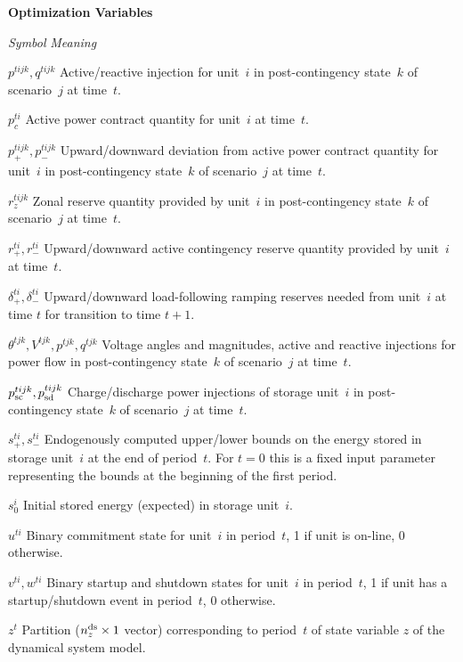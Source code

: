 \documentclass[12pt]{article}
\newcommand{\namelistlabel}[1]{\mbox{#1}\hfil}
\newenvironment{namelist}[1]{%
\begin{list}{}
  {
    \let\makelabel\namelistlabel
    \settowidth{\labelwidth}{#1}
    \setlength{\leftmargin}{1.1\labelwidth}
  }
 }{%
\end{list}}
\numberwithin{equation}{section}
\numberwithin{table}{section}
\numberwithin{figure}{section}
\begin{document}
\begin{namelist}{XXXXXXXXXX}
\item[]
\item[{\bf Optimization Variables}]
\item[\emph{Symbol}] \emph{Meaning}
\item[$p^{tijk}, q^{tijk}$] Active/reactive injection for unit~$i$ in post-contingency state~$k$ of scenario~$j$ at time~$t$.
\item[$p_c^{ti}$] Active power contract quantity for unit~$i$ at time~$t$.
\item[$p_+^{tijk}, p_-^{tijk}$] Upward/downward deviation from active power contract quantity for unit~$i$ in post-contingency state~$k$ of scenario~$j$ at time~$t$.
\item[$r_z^{tijk}$] Zonal reserve quantity provided by unit~$i$ in post-contingency state~$k$ of scenario~$j$ at time~$t$.
\item[$r_+^{ti}, r_-^{ti}$] Upward/downward active contingency reserve quantity provided by unit~$i$ at time~$t$.
\item[$\delta_+^{ti}, \delta_-^{ti}$] Upward/downward load-following ramping reserves needed from unit~$i$ at time $t$ for transition to time $t+1$.
\item[$\theta^{tjk}, V^{tjk}, p^{tjk}, q^{tjk}$] Voltage angles and magnitudes, active and reactive injections for power flow in post-contingency state~$k$ of scenario~$j$ at time~$t$.
\item[$p_{\rm sc}^{tijk}, p_{\rm sd}^{tijk}$] Charge/discharge power injections of storage unit~$i$ in post-contingency state~$k$ of scenario~$j$ at time~$t$.
\item[$s_+^{ti}, s_-^{ti}$] Endogenously computed upper/lower bounds on the energy stored in storage unit~$i$ at the end of period~$t$. For $t = 0$ this is a fixed input parameter representing the bounds at the beginning of the first period.
\item[$s_0^i$] Initial stored energy (expected) in storage unit~$i$.
\item[$u^{ti}$] Binary commitment state for unit~$i$ in period~$t$, 1 if unit is on-line, 0 otherwise.
\item[$v^{ti}, w^{ti}$] Binary startup and shutdown states for unit~$i$ in period~$t$, 1 if unit has a startup/shutdown event in period~$t$, 0 otherwise.
\item[$z^t$] Partition ($n_z^{\rm ds} \times 1$ vector) corresponding to period~$t$ of state variable $z$ of the dynamical system model.


\end{namelist}
\end{document}
